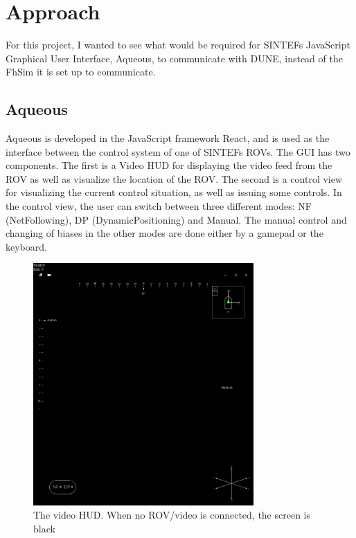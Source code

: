 \documentclass{article}
\begin{document}
%
%


%
%




\newpage
\section{Approach}
For this project, I wanted to see what would be required for SINTEFs JavaScript Graphical User Interface, Aqueous, to communicate with DUNE, instead of the FhSim it is set up to communicate.
\subsection{Aqueous}
Aqueous is developed in the JavaScript framework React, and is used as the interface between the control system of one of SINTEFs ROVs.
The GUI has two components. The first is a Video HUD for displaying the video feed from the ROV as well as visualize the location of the ROV. 
The second is a control view for visualizing the current control situation, as well as issuing some controls. 
In the control view, the user can switch between three different modes: NF (NetFollowing), DP (DynamicPositioning) and Manual.
The manual control and changing of biases in the other modes are done either by a gamepad or the keyboard. 

\begin{figure}[H]
    \centering
    \includegraphics[width=0.75\textwidth]{AqHUD.png}
    \caption{The video HUD. When no ROV/video is connected, the screen is black}
    \label{fig:HUD}
\end{figure}
\end{document}
